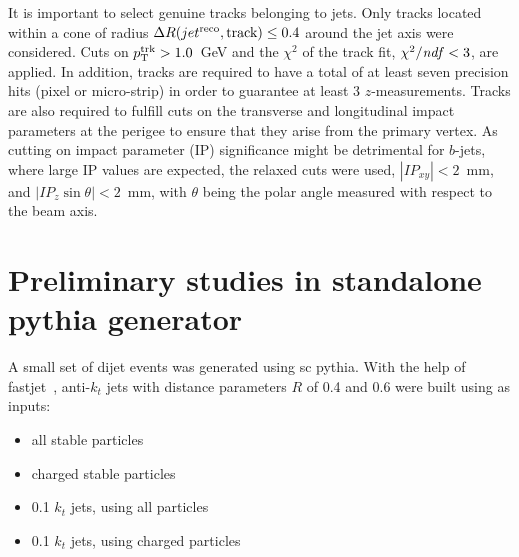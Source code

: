 
It is important to select genuine tracks belonging to jets. Only tracks located  within a cone of radius $\Delta R(jet^{\rm reco},\rm track) \leq 0.4$ around the jet axis were considered. %
  Cuts on $p_{\rm{T}}^{\rm{trk}}>1.0$~GeV and the $\chi^2$ of the track fit, $\chi^2/{\it ndf}<3$, are applied. %
 In addition, tracks are required to have a total of at least seven precision hits (pixel or micro-strip) in order to guarantee at least 3 $z$-measurements. Tracks are also required to fulfill cuts on the transverse and longitudinal impact parameters at the perigee to ensure that they arise from  the primary vertex. As cutting on impact parameter (IP) significance might be detrimental for $b$-jets, where large IP values are expected, the relaxed cuts were used, $|IP_{xy}|<2$~mm, and $|IP_{z}\sin\theta|<2$~mm, with $\theta$ being the polar angle measured with respect to the beam axis. %



\section{Preliminary studies in standalone {\sc pythia} generator}\label{sec:gbbKine}


A small set of dijet events was generated using {sc pythia}. With the help of fastjet~\cite{fastjet}, anti-$k_t$ jets with distance parameters $R$ of 0.4 and 0.6 were built using as inputs:

\begin{itemize}\addtolength{\itemsep}{-0.4\baselineskip}
\item
all stable particles
\item
charged stable particles
\item 
0.1 $k_t$ jets, using all particles 
\item 
0.1 $k_t$ jets, using charged particles 
\end{itemize}

